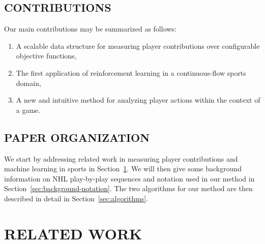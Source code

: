 \documentclass[]{article}
\begin{document}

\subsection{CONTRIBUTIONS}

Our main contributions may be summarized as follows:

\begin{enumerate}
\item A scalable data structure for measuring player contributions over configurable objective functions,
\item The first application of reinforcement learning in a continuous-flow sports domain,
\item A new and intuitive method for analyzing player actions within the context of a game.
\end{enumerate}


\subsection{PAPER ORGANIZATION}

We start by addressing related work in measuring player contributions and machine learning in sports in Section~\ref{sec:related-work}. We will then give some background information on NHL play-by-play sequences and notation used in our method in Section~\ref{sec:background-notation}. The two algorithms for our method are then described in detail in Section~\ref{sec:algorithms}.


\section{RELATED WORK}
\label{sec:related-work}
\end{document}
